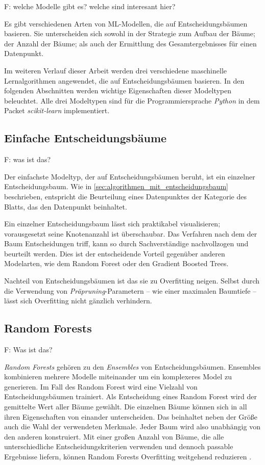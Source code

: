 F: welche Modelle gibt es? welche sind interesant hier?

Es gibt verschiedenen Arten von ML-Modellen, die auf Entscheidungsbäumen basieren. Sie unterscheiden sich sowohl in der Strategie zum Aufbau der Bäume; der Anzahl der Bäume; als auch der Ermittlung des Gesamtergebnisses für einen Datenpunkt. 

Im weiteren Verlauf dieser Arbeit werden drei verschiedene maschinelle Lernalgorithmen angewendet, die auf Entscheidungsbäumen basieren. In den folgenden Abschnitten werden wichtige Eigenschaften dieser Modeltypen beleuchtet. Alle drei Modeltypen sind für die Programmiersprache \textit{Python} in dem Packet \textit{scikit-learn} implementiert.

\subsection{Einfache Entscheidungsbäume}
\label{sec:einfache_entscheidungsbaeume}
F: was ist das?

Der einfachste Modeltyp, der auf Entscheidungsbäumen beruht, ist ein einzelner Entscheidungsbaum. Wie in \cref{sec:algorithmen_mit_entscheidungsbaum} beschrieben, entspricht die Beurteilung eines Datenpunktes der Kategorie des Blatts, das den Datenpunkt beinhaltet.

Ein einzelner Entscheidungsbaum lässt sich praktikabel visualisieren; vorausgesetzt seine Knotenanzahl ist überschaubar. Das Verfahren nach dem der Baum Entscheidungen triff, kann so durch Sachverständige nachvollzogen und beurteilt werden. Dies ist der entscheidende Vorteil gegenüber anderen Modelarten, wie dem Random Forest oder den Gradient Boosted Trees.

Nachteil von Entscheidungsbäumen ist das sie zu Overfitting neigen. Selbst durch die Verwendung von \textit{Präpruning}-Parametern -- wie einer maximalen Baumtiefe -- lässt sich Overfitting nicht gänzlich verhindern. \cite[S.~80]{Muller.2017}

\subsection{Random Forests}
\label{sec:random_forest}
F: Was ist das?

\textit{Random Forests} gehören zu den \textit{Ensembles} von Entscheidungsbäumen. Ensembles kombinieren mehrere Modelle miteinander um ein komplexeres Model zu generieren. Im Fall des Random Forest wird eine Vielzahl von Entscheidungsbäumen trainiert. Als Entscheidung eines Random Forest wird der gemittelte Wert aller Bäume gewählt. Die einzelnen Bäume können sich in all ihren Eigenschaften von einander unterscheiden. Das beinhaltet neben der Größe auch die Wahl der verwendeten Merkmale. Jeder Baum wird also unabhängig von den anderen konstruiert. Mit einer großen Anzahl von Bäume, die alle unterschiedliche Entscheidungskriterien verwenden und dennoch passable Ergebnisse liefern, können Random Forests Overfitting weitgehend reduzieren \cite{Muller.2017}.

